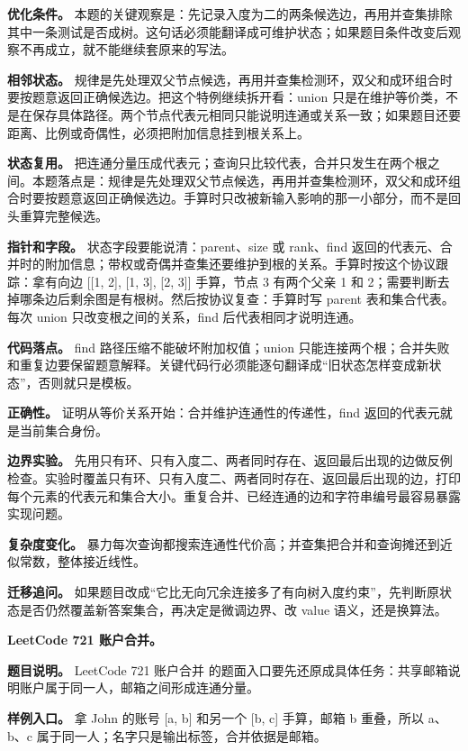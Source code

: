 \textbf{优化条件。} 本题的关键观察是：先记录入度为二的两条候选边，再用并查集排除其中一条测试是否成树。这句话必须能翻译成可维护状态；如果题目条件改变后观察不再成立，就不能继续套原来的写法。

\textbf{相邻状态。} 规律是先处理双父节点候选，再用并查集检测环，双父和成环组合时要按题意返回正确候选边。把这个特例继续拆开看：union 只是在维护等价类，不是在保存具体路径。两个节点代表元相同只能说明连通或关系一致；如果题目还要距离、比例或奇偶性，必须把附加信息挂到根关系上。

\textbf{状态复用。} 把连通分量压成代表元；查询只比较代表，合并只发生在两个根之间。本题落点是：规律是先处理双父节点候选，再用并查集检测环，双父和成环组合时要按题意返回正确候选边。手算时只改被新输入影响的那一小部分，而不是回头重算完整候选。

\textbf{指针和字段。} 状态字段要能说清：parent、size 或 rank、find 返回的代表元、合并时的附加信息；带权或奇偶并查集还要维护到根的关系。手算时按这个协议跟踪：拿有向边 [[1, 2], [1, 3], [2, 3]] 手算，节点 3 有两个父亲 1 和 2；需要判断去掉哪条边后剩余图是有根树。然后按协议复查：手算时写 parent 表和集合代表。每次 union 只改变根之间的关系，find 后代表相同才说明连通。

\textbf{代码落点。} find 路径压缩不能破坏附加权值；union 只能连接两个根；合并失败和重复边要保留题意解释。关键代码行必须能逐句翻译成“旧状态怎样变成新状态”，否则就只是模板。

\textbf{正确性。} 证明从等价关系开始：合并维护连通性的传递性，find 返回的代表元就是当前集合身份。

\textbf{边界实验。} 先用只有环、只有入度二、两者同时存在、返回最后出现的边做反例检查。实验时覆盖只有环、只有入度二、两者同时存在、返回最后出现的边，打印每个元素的代表元和集合大小。重复合并、已经连通的边和字符串编号最容易暴露实现问题。

\textbf{复杂度变化。} 暴力每次查询都搜索连通性代价高；并查集把合并和查询摊还到近似常数，整体接近线性。

\textbf{迁移追问。} 如果题目改成“它比无向冗余连接多了有向树入度约束”，先判断原状态是否仍然覆盖新答案集合，再决定是微调边界、改 value 语义，还是换算法。

\noindent\textbf{LeetCode 721 账户合并。}

\textbf{题目说明。} LeetCode 721 账户合并 的题面入口要先还原成具体任务：共享邮箱说明账户属于同一人，邮箱之间形成连通分量。

\textbf{样例入口。} 拿 John 的账号 [a, b] 和另一个 [b, c] 手算，邮箱 b 重叠，所以 a、b、c 属于同一人；名字只是输出标签，合并依据是邮箱。

